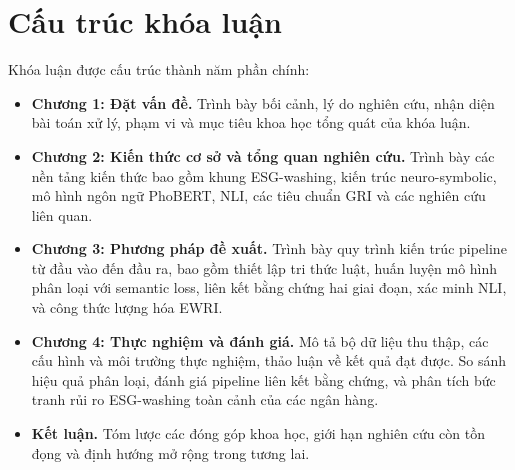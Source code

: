 \section{Cấu trúc khóa luận}
Khóa luận được cấu trúc thành năm phần chính:
\begin{itemize}
    \item \textbf{Chương 1: Đặt vấn đề.} Trình bày bối cảnh, lý do nghiên cứu, nhận diện bài toán xử lý, phạm vi và mục tiêu khoa học tổng quát của khóa luận.
    \item \textbf{Chương 2: Kiến thức cơ sở và tổng quan nghiên cứu.} Trình bày các nền tảng kiến thức bao gồm khung ESG-washing, kiến trúc neuro-symbolic, mô hình ngôn ngữ PhoBERT, NLI, các tiêu chuẩn GRI và các nghiên cứu liên quan.
    \item \textbf{Chương 3: Phương pháp đề xuất.} Trình bày quy trình kiến trúc pipeline từ đầu vào đến đầu ra, bao gồm thiết lập tri thức luật, huấn luyện mô hình phân loại với semantic loss, liên kết bằng chứng hai giai đoạn, xác minh NLI, và công thức lượng hóa EWRI.
    \item \textbf{Chương 4: Thực nghiệm và đánh giá.} Mô tả bộ dữ liệu thu thập, các cấu hình và môi trường thực nghiệm, thảo luận về kết quả đạt được. So sánh hiệu quả phân loại, đánh giá pipeline liên kết bằng chứng, và phân tích bức tranh rủi ro ESG-washing toàn cảnh của các ngân hàng.
    \item \textbf{Kết luận.} Tóm lược các đóng góp khoa học, giới hạn nghiên cứu còn tồn đọng và định hướng mở rộng trong tương lai.
\end{itemize}





